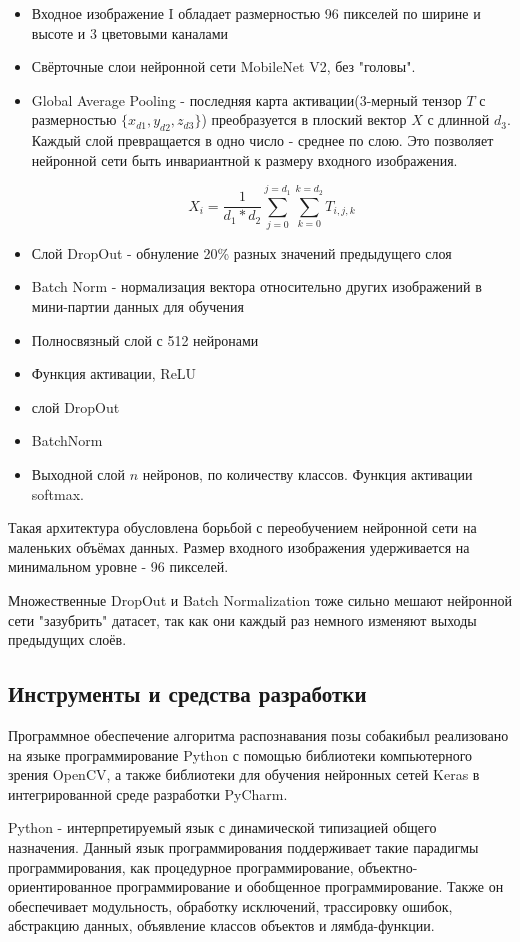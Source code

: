 \begin{itemize}
    \item Входное изображение I обладает размерностью 96 пикселей по ширине и высоте и 3 цветовыми каналами
    \item Свёрточные слои нейронной сети MobileNet V2\cite{mobilenet}, без "головы".
    \item Global Average Pooling - последняя карта активации(3-мерный тензор $T$ с размерностью $\{x_{d1}, y_{d2}, z_{d3}\}$) преобразуется в плоский вектор $X$ с длинной $d_3$. Каждый слой превращается в одно число - среднее по слою. Это позволяет нейронной сети быть инвариантной к размеру входного изображения.
    
    \[ X_i = \dfrac{1}{d_1*d_2}\sum_{j=0}^{j=d_1}\sum_{k=0}^{k=d_2}T_{i,j,k} \]
    
    \item Слой DropOut\cite{dropout} - обнуление 20\% разных значений предыдущего слоя
    \item Batch Norm\cite{batchnorm} - нормализация вектора относительно других изображений в мини-партии данных для обучения
    \item Полносвязный слой с 512 нейронами
    \item Функция активации, ReLU
    \item слой DropOut
    \item BatchNorm
    \item Выходной слой $n$ нейронов, по количеству классов. Функция активации softmax.
\end{itemize}

Такая архитектура обусловлена борьбой с переобучением нейронной сети на маленьких объёмах данных. Размер входного изображения удерживается на минимальном уровне - 96 пикселей.

Множественные DropOut и Batch Normalization тоже сильно мешают нейронной сети "зазубрить" датасет, так как они каждый раз немного изменяют выходы предыдущих слоёв.

\subsection{Инструменты и средства разработки}\label{ide}
Программное обеспечение алгоритма распознавания позы собакибыл реализовано на языке программирование Python с помощью библиотеки компьютерного зрения OpenCV, а также библиотеки для обучения нейронных сетей Keras в интегрированной среде разработки PyCharm.

Python - интерпретируемый язык с динамической типизацией общего назначения. Данный язык программирования поддерживает такие парадигмы программирования, как процедурное программирование, объектно-ориентированное программирование и обобщенное программирование. Также он обеспечивает модульность, обработку исключений, трассировку ошибок, абстракцию данных, объявление классов объектов и лямбда-функции.

